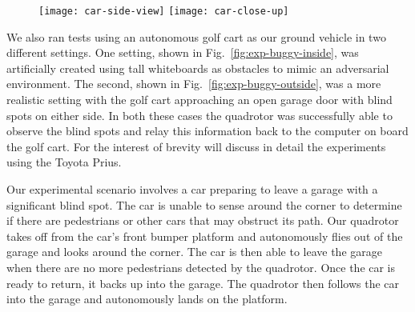 \begin{figure}[h!]

    \centering

    \texttt{[image: car-side-view]}
    \texttt{[image: car-close-up]}

    \caption{}

    \label{fig:car}

\end{figure}

We also ran tests using an autonomous golf cart as our ground vehicle in two
different settings.  One setting, shown in Fig.~\ref{fig:exp-buggy-inside}, was
artificially created using tall whiteboards as obstacles to mimic an
adversarial environment. The second, shown in Fig.~\ref{fig:exp-buggy-outside},
was a more realistic setting with the golf cart approaching an open garage door
with blind spots on either side. In both these cases the quadrotor was
successfully able to observe the blind spots and relay this information back to
the computer on board the golf cart. For the interest of brevity will discuss
in detail the experiments using the Toyota Prius.

Our experimental scenario involves a car preparing to leave a garage with a
significant blind spot. The car is unable to sense around the corner to
determine if there are pedestrians or other cars that may obstruct its path.
Our quadrotor takes off from the car's front bumper platform and autonomously
flies out of the garage and looks around the corner. The car is then able to
leave the garage when there are no more pedestrians detected by the quadrotor.
Once the car is ready to return, it backs up into the garage. The quadrotor
then follows the car into the garage and autonomously lands on the platform.

